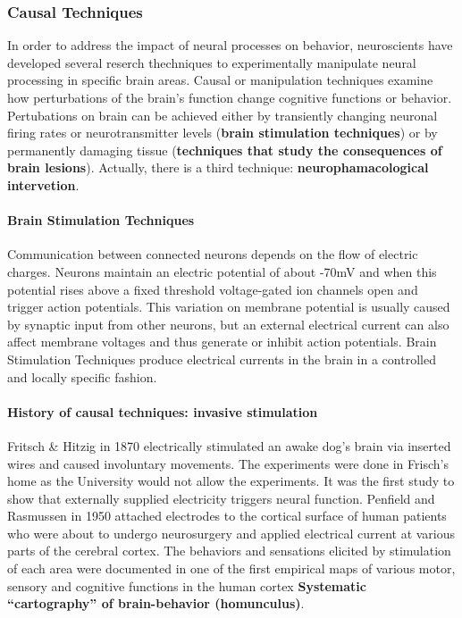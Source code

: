 \documentclass[12pt,article,oneside,a4paper]{memoir}
\begin{document}
\subsubsection{Causal Techniques}
In order to address the impact of neural processes on behavior, neuroscients have developed several reserch thechniques to experimentally manipulate neural processing in specific brain areas. Causal or manipulation techniques examine how perturbations of the brain’s function change cognitive functions or behavior. Pertubations on brain can be achieved either by transiently changing neuronal firing rates or neurotransmitter levels (\textbf{brain stimulation techniques}) or by permanently damaging tissue (\textbf{techniques that study the consequences of brain lesions}). Actually, there is a third technique: \textbf{neurophamacological intervetion}.

\paragraph{Brain Stimulation Techniques} Communication between connected neurons depends on the flow of electric charges. Neurons maintain an electric potential of about -70mV and when this potential rises above a fixed threshold voltage-gated ion channels open and trigger action potentials. This variation on membrane potential is usually caused by synaptic input from other neurons, but an external electrical current can also affect membrane voltages and thus generate or inhibit action potentials. Brain Stimulation Techniques produce electrical currents in the brain in a controlled and locally specific fashion.

\paragraph{History of causal techniques: invasive stimulation} Fritsch \& Hitzig in 1870 electrically stimulated an awake dog's brain via inserted wires and caused involuntary movements. The experiments were done in Frisch's home as the University would not allow the experiments. It was the first study to show that externally supplied electricity triggers neural function. Penfield and Rasmussen in 1950 attached electrodes to the cortical surface of human patients who were about to undergo neurosurgery and applied electrical current at various parts of the cerebral cortex. The behaviors and sensations elicited by stimulation of each area were documented in one of the first empirical maps of various motor, sensory and cognitive functions in the human cortex \textbf{Systematic ``cartography'' of brain-behavior (homunculus)}.\\
\end{document}

